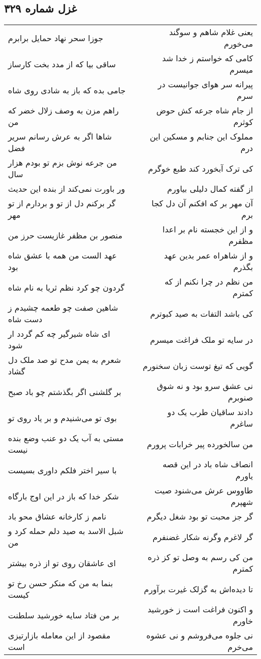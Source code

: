 \begin{center}
\section*{غزل شماره ۳۲۹}
\label{sec:sh329}
\begin{longtable}{l p{0.5cm} r}
جوزا سحر نهاد حمایل برابرم
&&
یعنی غلام شاهم و سوگند می‌خورم
\\
ساقی بیا که از مدد بخت کارساز
&&
کامی که خواستم ز خدا شد میسرم
\\
جامی بده که باز به شادی روی شاه
&&
پیرانه سر هوای جوانیست در سرم
\\
راهم مزن به وصف زلال خضر که من
&&
از جام شاه جرعه کش حوض کوثرم
\\
شاها اگر به عرش رسانم سریر فضل
&&
مملوک این جنابم و مسکین این درم
\\
من جرعه نوش بزم تو بودم هزار سال
&&
کی ترک آبخورد کند طبع خوگرم
\\
ور باورت نمی‌کند از بنده این حدیث
&&
از گفته کمال دلیلی بیاورم
\\
گر برکنم دل از تو و بردارم از تو مهر
&&
آن مهر بر که افکنم آن دل کجا برم
\\
منصور بن مظفر غازیست حرز من
&&
و از این خجسته نام بر اعدا مظفرم
\\
عهد الست من همه با عشق شاه بود
&&
و از شاهراه عمر بدین عهد بگذرم
\\
گردون چو کرد نظم ثریا به نام شاه
&&
من نظم در چرا نکنم از که کمترم
\\
شاهین صفت چو طعمه چشیدم ز دست شاه
&&
کی باشد التفات به صید کبوترم
\\
ای شاه شیرگیر چه کم گردد ار شود
&&
در سایه تو ملک فراغت میسرم
\\
شعرم به یمن مدح تو صد ملک دل گشاد
&&
گویی که تیغ توست زبان سخنورم
\\
بر گلشنی اگر بگذشتم چو باد صبح
&&
نی عشق سرو بود و نه شوق صنوبرم
\\
بوی تو می‌شنیدم و بر یاد روی تو
&&
دادند ساقیان طرب یک دو ساغرم
\\
مستی به آب یک دو عنب وضع بنده نیست
&&
من سالخورده پیر خرابات پرورم
\\
با سیر اختر فلکم داوری بسیست
&&
انصاف شاه باد در این قصه یاورم
\\
شکر خدا که باز در این اوج بارگاه
&&
طاووس عرش می‌شنود صیت شهپرم
\\
نامم ز کارخانه عشاق محو باد
&&
گر جز محبت تو بود شغل دیگرم
\\
شبل الاسد به صید دلم حمله کرد و من
&&
گر لاغرم وگرنه شکار غضنفرم
\\
ای عاشقان روی تو از ذره بیشتر
&&
من کی رسم به وصل تو کز ذره کمترم
\\
بنما به من که منکر حسن رخ تو کیست
&&
تا دیده‌اش به گزلک غیرت برآورم
\\
بر من فتاد سایه خورشید سلطنت
&&
و اکنون فراغت است ز خورشید خاورم
\\
مقصود از این معامله بازارتیزی است
&&
نی جلوه می‌فروشم و نی عشوه می‌خرم
\\
\end{longtable}
\end{center}
